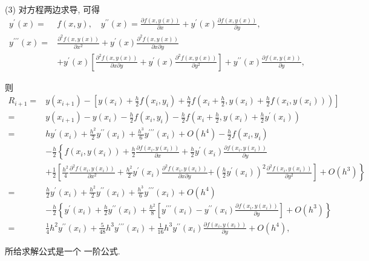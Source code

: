 \begin{tcolorbox}
(3)
对方程两边求导, 可得
$$
\begin{aligned}
 y^{\prime}(x)=&f(x, y), \quad y^{\prime \prime}(x)=\frac{\partial f(x, y(x))}{\partial x}+y^{\prime}(x) \frac{\partial f(x, y(x))}{\partial y}, \\
y^{\prime \prime \prime}(x)= & \frac{\partial^{2} f(x, y(x))}{\partial x^{2}}+y^{\prime}(x) \frac{\partial^{2} f(x, y(x))}{\partial x \partial y} \\
& +y^{\prime}(x)\left[\frac{\partial^{2} f(x, y(x))}{\partial x \partial y}+y^{\prime}(x) \frac{\partial^{2} f(x, y(x))}{\partial y^{2}}\right]+y^{\prime \prime}(x) \frac{\partial f(x, y(x))}{\partial y},
\end{aligned}
$$

则
$$
\begin{aligned}
R_{i+1}= & y\left(x_{i+1}\right)-\left[y\left(x_{i}\right)+\frac h2 f(x_i,y_i)+\frac h2 f\left(x_{i}+\frac{h}{2}, y\left(x_{i}\right)+\frac{h}{2} f\left(x_{i}, y\left(x_{i}\right)\right)\right)\right] \\
= & y\left(x_{i+1}\right)-y\left(x_{i}\right)-\frac h2 f(x_i,y_i)-\frac h2 f\left(x_{i}+\frac{h}{2}, y\left(x_{i}\right)+\frac{h}{2} y^{\prime}\left(x_{i}\right)\right) \\
= & h y^{\prime}\left(x_{i}\right)+\frac{h^{2}}{2} y^{\prime \prime}\left(x_{i}\right)+\frac{h^{3}}{6} y^{\prime \prime \prime}\left(x_{i}\right)+O\left(h^{4}\right)-\frac h2 f(x_i,y_i) \\
& -\frac h2\left\{f\left(x_{i}, y\left(x_{i}\right)\right)+\frac{h}{2} \frac{\partial f\left(x_{i}, y\left(x_{i}\right)\right)}{\partial x}+\frac{h}{2} y^{\prime}\left(x_{i}\right) \frac{\partial f\left(x_{i}, y\left(x_{i}\right)\right)}{\partial y}\right. \\
& +\frac{1}{2}\left[\frac{h^{2}}{4} \frac{\partial^{2} f\left(x_{i}, y\left(x_{i}\right)\right)}{\partial x^{2}}+\frac{h^{2}}{2} y^{\prime}\left(x_{i}\right) \frac{\partial^{2} f\left(x_{i}, y\left(x_{i}\right)\right)}{\partial x \partial y}\right.  \left.\left.+\left(\frac{h}{2} y^{\prime}\left(x_{i}\right)\right)^{2} \frac{\partial^{2} f\left(x_{i}, y\left(x_{i}\right)\right)}{\partial y^{2}}\right]+O\left(h^{3}\right)\right\} \\
= & \frac h2 y^{\prime}\left(x_{i}\right)+\frac{h^{2}}{2} y^{\prime \prime}\left(x_{i}\right)+\frac{h^{3}}{6} y^{\prime \prime \prime}\left(x_{i}\right)+O\left(h^{4}\right) \\
& -\frac h2\left\{y^{\prime}\left(x_{i}\right)+\frac{h}{2} y^{\prime \prime}\left(x_{i}\right)+\frac{h^{2}}{8}\left[y^{\prime \prime \prime}\left(x_{i}\right)-y^{\prime \prime}\left(x_{i}\right) \frac{\partial f\left(x_{i}, y\left(x_{i}\right)\right)}{\partial y}\right]+O\left(h^{3}\right)\right\} \\
= &\frac 14 h^2y^{\prime \prime}\left(x_{i}\right)+ \frac{5}{48}h^3 y^{\prime \prime \prime}\left(x_{i}\right)+\frac{1}{16}h^3 y^{\prime \prime}\left(x_{i}\right) \frac{\partial f\left(x_{i}, y\left(x_{i}\right)\right)}{\partial y}+O\left(h^{4}\right),
\end{aligned}
$$

所给求解公式是一个 一阶公式.

  \end{tcolorbox}


